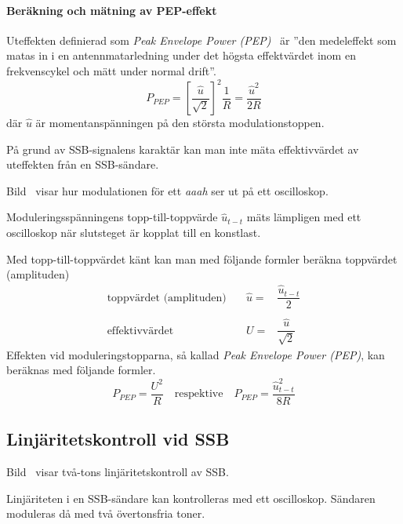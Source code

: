 \paragraph{Beräkning och mätning av PEP-effekt}

Uteffekten definierad som \emph{Peak Envelope Power (PEP)}~\cite[1.157]{ITU-RR}
är ''den medeleffekt som matas in i en antennmatarledning under det högsta
effektvärdet inom en frekvenscykel och mätt under normal drift''.
%
\[P_{PEP} = \left[\dfrac{\hat{u}}{\sqrt{2}}\right]^2\dfrac{1}{R} =  \dfrac{\hat{u}^2}{2R}\]
%
där \(\hat{u}\) är momentanspänningen på den största modulationstoppen.


På grund av SSB-signalens karaktär kan man inte mäta effektivvärdet av
uteffekten från en SSB-sändare.

Bild~ visar hur modulationen för ett \emph{aaah} ser ut
på ett oscilloskop.

Moduleringsspänningens topp-till-topp\-värde \(\hat{u}_{t-t}\) mäts lämpligen med ett
oscilloskop när slutsteget är kopplat till en konstlast.

Med topp-till-toppvärdet känt kan man med följande formler beräkna
toppvärdet (amplituden)
%
\[
\begin{array}{lll}
\text{toppvärdet (amplituden)} &  \quad \hat{u}= & \dfrac{\hat{u}_{t-t}}{2}\\
& & \\
\text{effektivvärdet} &\quad  U =& \dfrac{\hat{u}}{\sqrt{2}}
\end{array}
\]%
%
Effekten vid moduleringstopparna, så kallad \emph{Peak Envelope Power (PEP)},
kan beräknas med följande formler.
%
\[
P_{PEP} = \dfrac{U^2}{R} \quad\text{respektive}\quad
P_{PEP} = \dfrac{\hat{u}_{t-t}^2}{8R}
\]

\subsection{Linjäritetskontroll vid SSB}


Bild~ visar två-tons linjäritetskontroll av SSB.

Linjäriteten i en SSB-sändare kan kontrolleras med ett oscilloskop.
Sändaren moduleras då med två övertonsfria toner.

